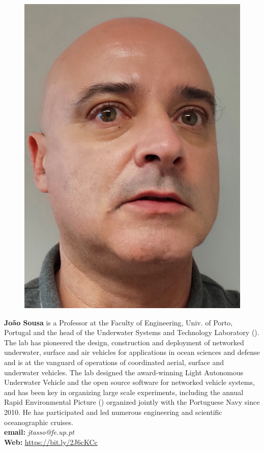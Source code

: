 \vspace*{3cm}
\parbox{5.5in}{
\begin{figure} %
  \vspace{-\intextsep}
    \hspace*{-.35\columnsep}\includegraphics[scale=0.08]{fig/JBS.jpg}
\end{figure}
\textbf{Jo\~ao Sousa} is a Professor at the Faculty of Engineering,
Univ. of Porto, Portugal and the head of the Underwater Systems and
Technology Laboratory (\lse). The lab has pioneered the design,
construction and deployment of networked underwater, surface and air
vehicles for applications in ocean sciences and defense and is at the
vanguard of operations of coordinated aerial, surface and underwater
vehicles. The lab designed the award-winning Light Autonomous
Underwater Vehicle and the \ls open source software for networked
vehicle systems, and has been key in organizing large scale
experiments, including the annual Rapid Environmental Picture (\rpe)
organized jointly with the Portuguese Navy since 2010. He has
participated and led numerous engineering and scientific oceanographic
cruises.
\\
\textbf{email: }\emph{jtasso@fe.up.pt}\\
\textbf{Web: }\url{https://bit.ly/2J6cKCc}}

